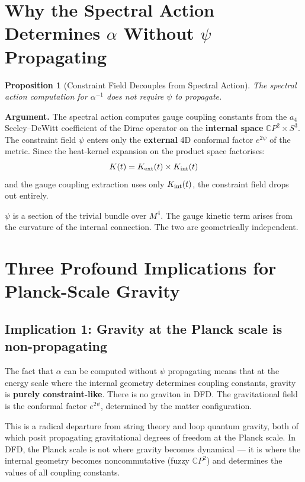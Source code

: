 \documentclass[12pt,a4paper]{article}
\newtheorem{proposition}{Proposition}
\newcommand{\CP}{\mathbb{C}P}
\begin{document}
\section{Why the Spectral Action Determines $\alpha$ Without $\psi$ Propagating}

\begin{proposition}[Constraint Field Decouples from Spectral Action]
\label{prop:decouple}
The spectral action computation for $\alpha^{-1}$ does not require $\psi$ to propagate.
\end{proposition}

\textbf{Argument.} The spectral action computes gauge coupling constants from the $a_4$ Seeley--DeWitt coefficient of the Dirac operator on the \textbf{internal space} $\CP^2 \times S^3$. The constraint field $\psi$ enters only the \textbf{external} 4D conformal factor $e^{2\psi}$ of the metric. Since the heat-kernel expansion on the product space factorises:
\begin{equation}
K(t) = K_{\rm ext}(t) \times K_{\rm int}(t)
\end{equation}
and the gauge coupling extraction uses only $K_{\rm int}(t)$, the constraint field drops out entirely.

$\psi$ is a section of the trivial bundle over $M^4$. The gauge kinetic term arises from the curvature of the internal connection. The two are geometrically independent.

\section{Three Profound Implications for Planck-Scale Gravity}

\subsection{Implication 1: Gravity at the Planck scale is non-propagating}

The fact that $\alpha$ can be computed without $\psi$ propagating means that at the energy scale where the internal geometry determines coupling constants, gravity is \textbf{purely constraint-like}. There is no graviton in DFD. The gravitational field is the conformal factor $e^{2\psi}$, determined by the matter configuration.

This is a radical departure from string theory and loop quantum gravity, both of which posit propagating gravitational degrees of freedom at the Planck scale. In DFD, the Planck scale is not where gravity becomes dynamical --- it is where the internal geometry becomes noncommutative (fuzzy $\CP^2$) and determines the values of all coupling constants.
\end{document}
